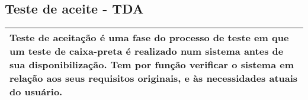 





\subsection{Teste de aceite - TDA}
\label{sec:tda}

\begin{table}[H]
\centering
\begin{tabular}{|p{130mm}|}
\hline
Teste de aceitação é uma fase do processo de teste em que um teste de caixa-preta é realizado num sistema antes de sua disponibilização. Tem por função verificar o sistema em relação aos seus requisitos originais, e às necessidades atuais do usuário. \\ 
\hline
\end{tabular}
\end{table}

